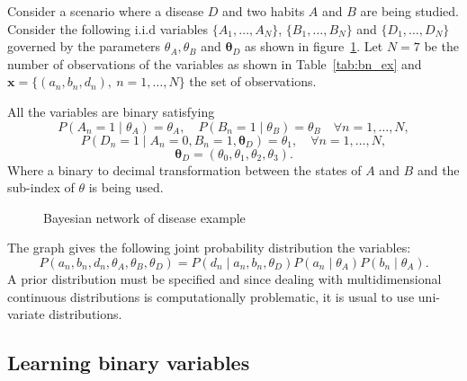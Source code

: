 \documentclass[11pt]{article}
\theoremstyle{definition}
\begin{document}
Consider a scenario where a disease \(D\) and two habits \(A\) and \(B\) are being studied.  Consider the following i.i.d variables \(\{A_{1},\dots, A_{N}\}\), \(\{B_{1},\dots,B_{N}\}\) and \(\{D_{1},\dots, D_{N}\}\) governed by the parameters \(\theta_{A}, \theta_{B}\) and \(\bm{\theta}_{D}\) as shown in figure~\ref{fig:bayesian_example}. Let \(N = 7\) be the number of observations of the variables as shown in Table~\ref{tab:bn_ex} and \( \bm{x} = \{(a_n, b_n, d_n),\ n=1,\dots,N\} \) the set of observations.

All the variables are binary satisfying
\[
  P(A_{n} = 1 \mid \theta_{A}) = \theta_{A}, \quad P(B_{n} = 1 \mid \theta_{B}) = \theta_{B} \quad \forall n=1,\dots,N,
\]
\[
  P(D_{n} = 1 \mid A_{n} = 0, B_{n} = 1, \bm{\theta}_{D}) = \theta_{1}, \quad \forall n = 1,\dots,N,
\]
\[
  \bm{\theta}_{D} = ( \theta_{0}, \theta_{1}, \theta_{2}, \theta_{3}).
\]
Where a binary to decimal transformation between the states of \(A\) and \(B\) and the sub-index of \(\theta\) is being used.

\begin{figure}[H]
  \centering
{}
\caption{Bayesian network of disease example}\label{fig:bayesian_example}
\end{figure}


The graph gives the following joint probability distribution the variables:
\[
P(a_{n},b_{n},d_{n}, \theta_A, \theta_B, \theta_D) = P(d_{n}\mid a_{n},b_{n},\theta_D)P(a_{n} \mid \theta_A)P(b_{n} \mid \theta_A).
\]
A prior distribution must be specified and since dealing with multidimensional continuous
distributions is computationally problematic, it is usual to use uni-variate
distributions.

\subsection{Learning binary variables}
\end{document}
